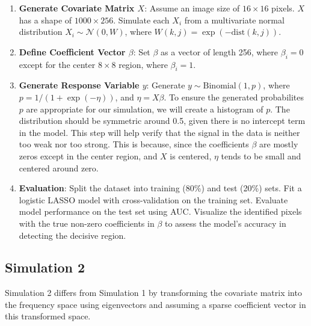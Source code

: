 \documentclass[12pt]{article}
\begin{document}
\begin{enumerate}
	\item \textbf{Generate Covariate Matrix \( X \)}: Assume an image size of \(16 \times 16\) pixels. \( X \) has a shape of \(1000 \times 256\). Simulate each \( X_i \) from a multivariate normal distribution \( X_i \sim \mathcal{N}(0, W) \), where \( W(k, j) = \exp(-\text{dist}(k, j)) \).

	\item \textbf{Define Coefficient Vector \( \beta \)}: Set \(\beta\) as a vector of length 256, where \(\beta_i = 0\) except for the center \(8 \times 8\) region, where \(\beta_i = 1\).

	\item \textbf{Generate Response Variable \( y \)}: Generate \( y \sim \text{Binomial}(1, p) \), where \( p = 1 /  (1 + \exp(-\eta)) \), and \( \eta = X \beta \). To ensure the generated probabilites \( p \) are appropriate for our simulation, we will create a histogram of \( p \). The distribution should be symmetric around 0.5, given there is no intercept term in the model. This step will help verify that the signal in the data is neither too weak nor too strong. This is because, since the coefficients \( \beta \) are mostly zeros except in the center region, and \( X \) is centered, \( \eta \) tends to be small and centered around zero.

	\item \textbf{Evaluation}: Split the dataset into training (80\%) and test (20\%) sets. Fit a logistic LASSO model with cross-validation on the training set. Evaluate model performance on the test set using AUC. Visualize the identified pixels with the true non-zero coefficients in \(\beta\) to assess the model's accuracy in detecting the decisive region.
\end{enumerate}

\subsection*{Simulation 2}

Simulation 2 differs from Simulation 1 by transforming the covariate matrix into the frequency space using eigenvectors and assuming a sparse coefficient vector in this transformed space.
\end{document}
